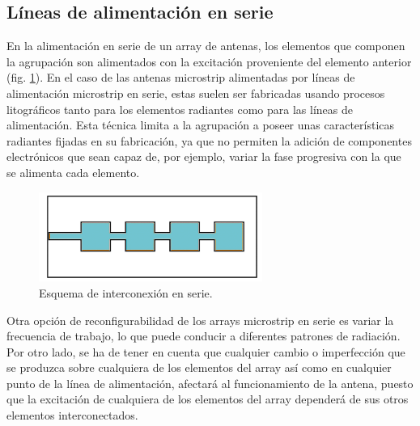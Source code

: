 \subsection{Líneas de alimentación en serie}
\par En la alimentación en serie de un array de antenas, los elementos  que componen la agrupación son alimentados con la excitación proveniente del elemento anterior (fig. \ref{fig:seriesfeed}). En el caso de las antenas microstrip alimentadas por líneas de alimentación microstrip en serie, estas suelen ser fabricadas usando procesos litográficos tanto para los elementos radiantes como para las líneas de alimentación. Esta técnica limita a la agrupación a poseer unas características radiantes fijadas en su fabricación, ya que no permiten la adición de componentes electrónicos que sean capaz de, por ejemplo, variar la fase progresiva con la que se alimenta cada elemento. \cite{Balanis2015}
\\
\begin{figure}[h]
    \centering
        \includegraphics[width=0.65\textwidth]{archivos/array/series}
        \caption{Esquema de interconexión en serie. \cite{Balanis2015}}
        \label{fig:seriesfeed}
\end{figure}

\par Otra opción de reconfigurabilidad de los arrays microstrip en serie es variar la frecuencia de trabajo, lo que puede conducir a diferentes patrones de radiación. Por otro lado, se ha de tener en cuenta que cualquier cambio o imperfección que se produzca sobre cualquiera de los elementos del array así como en cualquier punto de la línea de alimentación, afectará al funcionamiento de la antena, puesto que la excitación de cualquiera de los elementos del array dependerá de sus otros elementos interconectados.

